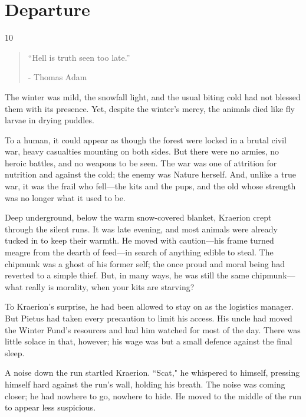 \chapter{Departure} %

\vspace{-1.3cm}
\begin{localsize}{10}
    \begin{quote}
        “Hell is truth seen too late.”
        \begin{flushright}- Thomas Adam \end{flushright}
    \end{quote}
\end{localsize}
\vspace{1cm}

The winter was mild, the snowfall light, and the usual biting cold had not blessed them with its presence.
Yet, despite the winter's mercy, the animals died like fly larvae in drying puddles.

To a human, it could appear as though the forest were locked in a brutal civil war, heavy casualties mounting on both sides.
But there were no armies, no heroic battles, and no weapons to be seen.
The war was one of attrition for nutrition and against the cold; the enemy was Nature herself.
And, unlike a true war, it was the frail who fell---the kits and the pups, and the old whose strength was no longer what it used to be.

Deep underground, below the warm snow-covered blanket, Kraerion crept through the silent runs.
It was late evening, and most animals were already tucked in to keep their warmth.
He moved with caution---his frame turned meagre from the dearth of feed---in search of anything edible to steal.
The chipmunk was a ghost of his former self; the once proud and moral being had reverted to a simple thief.
But, in many ways, he was still the same chipmunk---what really is morality, when your kits are starving?

To Kraerion's surprise, he had been allowed to stay on as the logistics manager.
But Pietus had taken every precaution to limit his access.
His uncle had moved the Winter Fund's resources and had him watched for most of the day.
There was little solace in that, however; his wage was but a small defence against the final sleep.

A noise down the run startled Kraerion.
``Scat," he whispered to himself, pressing himself hard against the run's wall, holding his breath.
The noise was coming closer; he had nowhere to go, nowhere to hide.
He moved to the middle of the run to appear less suspicious.

